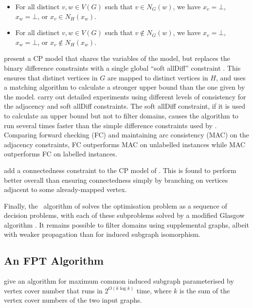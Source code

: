 \begin{itemize}
    \item For all distinct $v, w \in V(G)$ such that $v \in N_G(w)$, we have 
$x_v=\bot$,
$x_w=\bot$, or
$x_v \in N_H(x_w)$.
\item For all distinct $v, w \in V(G)$ such that $v \not\in N_G(w)$, we have 
$x_v=\bot$,
$x_w=\bot$, or
$x_v \not\in N_H(x_w)$.
\end{itemize}

\citet{DBLP:conf/cp/NdiayeS11} present a CP model that shares the variables
of the \citeauthor{DBLP:conf/mco/VismaraV08} model, but replaces the binary difference
constraints with a single global ``soft allDiff''
constraint \citep{DBLP:conf/cp/PetitRB01}.  This ensures that distinct vertices
in $G$ are mapped to distinct vertices in $H$, and uses a matching algorithm
to calculate a stronger upper bound than the one given by
the \citeauthor{DBLP:conf/mco/VismaraV08} model.
\citeauthor{DBLP:conf/cp/NdiayeS11} carry out detailed experiments using
different levels of consistency for the adjacency and soft allDiff constraints.
The soft allDiff constraint, if it is used to calculate an upper bound but
not to filter domains, causes the algorithm to run several times faster
than the simple difference constraints used by \citeauthor{DBLP:conf/mco/VismaraV08}.
Comparing forward checking (FC) and maintaining arc consistency (MAC)
on the adjacency constraints, FC outperforms MAC on unlabelled instances
while MAC outperforms FC on labelled instances.

\cite{DBLP:conf/cp/McCreeshNPS16} add a connectedness constraint to the CP
model of \citet{DBLP:conf/cp/NdiayeS11}.  This is found to perform better
overall than ensuring connectedness simply by branching on vertices adjacent to
some already-mapped vertex.

Finally, the \kDown\ algorithm of \citet{UpcomingAAAIPaper}
solves the optimisation problem as a sequence of decision problems, with
each of these subproblems solved by a modified Glasgow algorithm
\citep{DBLP:conf/cp/McCreeshP15}.  It remains possible to filter
domains using supplemental graphs, albeit with weaker propagation
than for induced subgraph isomorphism.

\subsection{An FPT Algorithm}\label{mcis-fpt-algorithms}

\citet{DBLP:journals/tcs/Abu-KhzamBS17} give an algorithm for maximum
common induced subgraph parameterised by vertex cover number that runs
in $2^{O(k \log k)}$ time, where $k$ is the sum of the vertex cover numbers
of the two input graphs.

